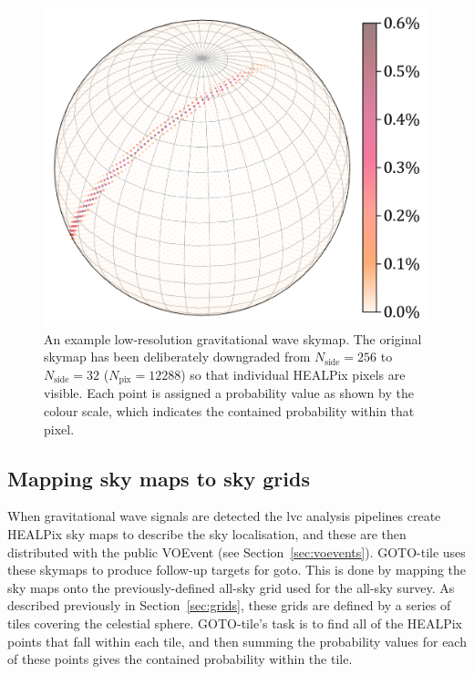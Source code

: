 \begin{colsection}
\begin{colsection}
\begin{figure}[p]
\begin{center}
\includegraphics[width=\linewidth]{images/skymap_plot.pdf}
\end{center}
\caption[An example low-resolution skymap]{An example low-resolution gravitational wave skymap. The original skymap has been deliberately downgraded from $N_\text{side} = 256$ to $N_\text{side} = 32$ ($N_\text{pix} = 12288$) so that individual HEALPix pixels are visible. Each point is assigned a probability value as shown by the colour scale, which indicates the contained probability within that pixel.
}
\label{fig:example_skymap}
\end{figure}

\end{colsection}


\subsection{Mapping sky maps to sky grids}
\label{sec:mapping_skymaps}
\begin{colsection}

When gravitational wave signals are detected the \gls{lvc} analysis pipelines create HEALPix sky maps to describe the sky localisation, and these are then distributed with the public VOEvent (see Section~\ref{sec:voevents}). GOTO-tile uses these skymaps to produce follow-up targets for \gls{goto}. This is done by mapping the sky maps onto the previously-defined all-sky grid used for the all-sky survey. As described previously in Section~\ref{sec:grids}, these grids are defined by a series of tiles covering the celestial sphere. GOTO-tile's task is to find all of the HEALPix points that fall within each tile, and then summing the probability values for each of these points gives the contained probability within the tile.


\end{colsection}
\end{colsection}
